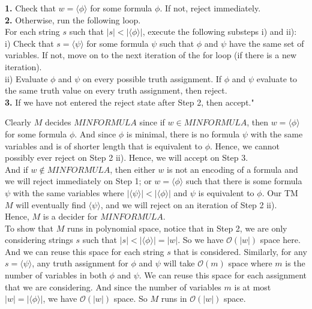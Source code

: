 \documentclass[12pt]{article}
\begin{document}
\setlength\parindent{15pt}

\indent \textbf{1.} Check that $w = \langle \phi \rangle$ for some formula $\phi$. If not, reject immediately. \\

\textbf{2.} Otherwise, run the following loop. \\

For each string $s$ such that $|s| < |\langle \phi \rangle|$, execute the following substeps i) and ii): \\

i) Check that $s = \langle \psi \rangle$ for some formula $\psi$ such that $\phi$ and $\psi$ have the same set of variables. If not, move on to the next iteration of the for loop (if there is a new iteration). \\

ii) Evaluate $\phi$ and $\psi$ on every possible truth assignment. If $\phi$ and $\psi$ evaluate to the same truth value on every truth assignment, then reject. \\

\textbf{3.} If we have not entered the reject state after Step 2, then accept." \\

\setlength\parindent{0pt}

Clearly $M$ decides $MINFORMULA$ since if $w \in MINFORMULA$, then $w = \langle \phi \rangle$ for some formula $\phi$. And since $\phi$ is minimal, there is no formula $\psi$ with the same variables and is of shorter length that is equivalent to $\phi$. Hence, we cannot possibly ever reject on Step 2 ii). Hence, we will accept on Step 3. \\

And if $w \not \in MINFORMULA$, then either $w$ is not an encoding of a formula and we will reject immediately on Step 1; or $w = \langle \phi \rangle$ such that there is some formula $\psi$ with the same variables where $|\langle \psi \rangle| < |\langle \phi \rangle|$ and $\psi$ is equivalent to $\phi$. Our TM $M$ will eventually find $\langle \psi \rangle$, and we will reject on an iteration of Step 2 ii). \\

Hence, $M$ is a decider for $MINFORMULA$. \\

To show that $M$ runs in polynomial space, notice that in Step 2, we are only considering strings $s$ such that $|s| < |\langle \phi \rangle| = |w|$. So we have $\mathcal{O}(|w|)$ space here. And we can reuse this space for each string $s$ that is considered. Similarly, for any $s = \langle \psi \rangle$, any truth assignment for $\phi$ and $\psi$ will take $\mathcal{O}(m)$ space where $m$ is the number of variables in both $\phi$ and $\psi$. We can reuse this space for each assignment that we are considering. And since the number of variables $m$ is at most $|w| = |\langle \phi \rangle|$, we have $\mathcal{O}(|w|)$ space. So $M$ runs in $\mathcal{O}(|w|)$ space. \\
\end{document}
